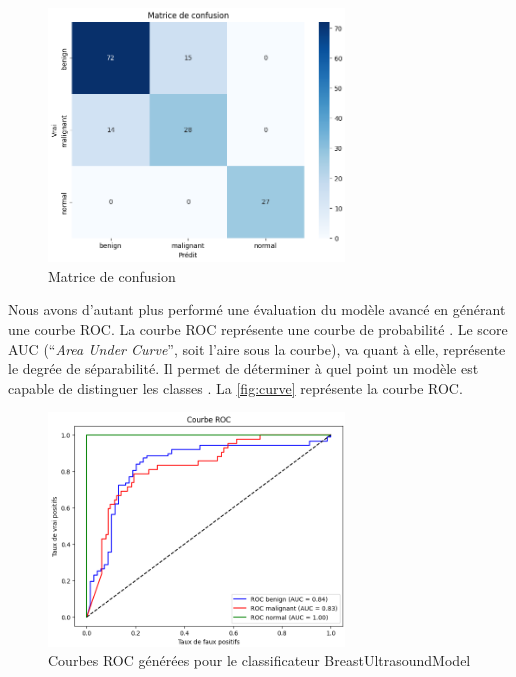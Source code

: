 \documentclass[a4paper,12pt]{article}
\begin{document}
\begin{figure}[h]
\centering
\includegraphics[width=0.7\textwidth]{confusion_matrix.png}
\caption{Matrice de confusion}
\label{fig:confusionmatrix}
\end{figure}

Nous avons d'autant plus performé une évaluation du modèle avancé en générant une courbe ROC. La courbe ROC représente une courbe de probabilité \cite{narkhede2018understanding}.
Le score AUC (\enquote{\textit{Area Under Curve}}, soit l'aire sous la courbe), va quant à elle, représente le degrée de séparabilité. Il permet de déterminer à quel point un modèle est capable de distinguer les classes \cite{narkhede2018understanding}. La \autoref{fig:curve} représente la courbe ROC.
\clearpage

\begin{figure}[h]
\centering
\includegraphics[width=0.7\textwidth]{roc_curve.png}
\caption{Courbes ROC générées pour le classificateur BreastUltrasoundModel}
\label{fig:curve}
\end{figure}
\end{document}
